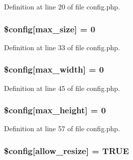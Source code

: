 Definition at line 20 of file config.\+php.

\subsubsection[{\texorpdfstring{\$config}{$config}}]{\setlength{\rightskip}{0pt plus 5cm}\$config\mbox{[}\textquotesingle{}max\+\_\+size\textquotesingle{}\mbox{]} = 0}\hypertarget{config_8php_a08ef9a43e1ca734499df35a4e9a77e49}{}\label{config_8php_a08ef9a43e1ca734499df35a4e9a77e49}


Definition at line 33 of file config.\+php.

\subsubsection[{\texorpdfstring{\$config}{$config}}]{\setlength{\rightskip}{0pt plus 5cm}\$config\mbox{[}\textquotesingle{}max\+\_\+width\textquotesingle{}\mbox{]} = 0}\hypertarget{config_8php_a27019f4fc442fa2b86b4477ab220a062}{}\label{config_8php_a27019f4fc442fa2b86b4477ab220a062}


Definition at line 45 of file config.\+php.

\subsubsection[{\texorpdfstring{\$config}{$config}}]{\setlength{\rightskip}{0pt plus 5cm}\$config\mbox{[}\textquotesingle{}max\+\_\+height\textquotesingle{}\mbox{]} = 0}\hypertarget{config_8php_a3b7844b3d06123a510c1cc1bd6225fe5}{}\label{config_8php_a3b7844b3d06123a510c1cc1bd6225fe5}


Definition at line 57 of file config.\+php.

\subsubsection[{\texorpdfstring{\$config}{$config}}]{\setlength{\rightskip}{0pt plus 5cm}\$config\mbox{[}\textquotesingle{}allow\+\_\+resize\textquotesingle{}\mbox{]} = T\+R\+UE}\hypertarget{config_8php_a37f0f0a570e5355ebe3cf54b961d88be}{}\label{config_8php_a37f0f0a570e5355ebe3cf54b961d88be}


